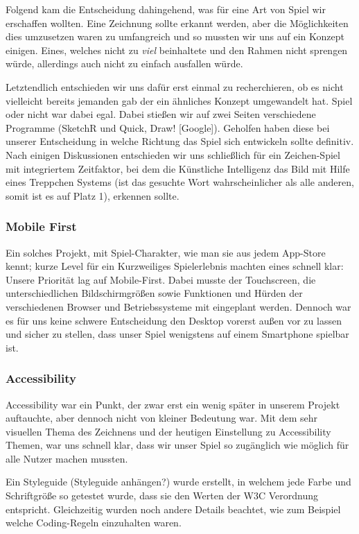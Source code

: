 \documentclass[11pt]{article}
\begin{document}
Folgend kam die Entscheidung dahingehend, was für eine Art von Spiel wir erschaffen wollten. Eine Zeichnung sollte erkannt werden, aber die Möglichkeiten dies umzusetzen waren zu umfangreich und so mussten wir uns auf ein Konzept einigen. Eines, welches nicht zu \textit{viel} beinhaltete und den Rahmen nicht sprengen würde, allerdings auch nicht zu einfach ausfallen würde.

Letztendlich entschieden wir uns dafür erst einmal zu recherchieren, ob es nicht vielleicht bereits jemanden gab der ein ähnliches Konzept umgewandelt hat. Spiel oder nicht war dabei egal.
Dabei stießen wir auf zwei Seiten verschiedene Programme (SketchR und Quick, Draw! [Google]). Geholfen haben diese bei unserer Entscheidung in welche Richtung das Spiel sich entwickeln sollte definitiv. Nach einigen Diskussionen entschieden wir uns schließlich für ein Zeichen-Spiel mit integriertem Zeitfaktor, bei dem die Künstliche Intelligenz das Bild mit Hilfe eines Treppchen Systems (ist das gesuchte Wort wahrscheinlicher als alle anderen, somit ist es auf Platz 1), erkennen sollte.

\subsubsection{Mobile First}

Ein solches Projekt, mit Spiel-Charakter, wie man sie aus jedem App-Store kennt; kurze Level für ein Kurzweiliges Spielerlebnis machten eines schnell klar: Unsere Priorität lag auf Mobile-First.
Dabei musste der Touchscreen, die unterschiedlichen Bildschirmgrößen sowie Funktionen und Hürden der verschiedenen Browser und Betriebssysteme mit eingeplant werden. Dennoch war es für uns keine schwere Entscheidung den Desktop vorerst außen vor zu lassen und sicher zu stellen, dass unser Spiel wenigstens auf einem Smartphone spielbar ist.

\subsubsection{Accessibility}

Accessibility war ein Punkt, der zwar erst ein wenig später in unserem Projekt auftauchte, aber dennoch nicht von kleiner Bedeutung war. Mit dem sehr visuellen Thema des Zeichnens und der heutigen Einstellung zu Accessibility Themen, war uns schnell klar, dass wir unser Spiel so zugänglich wie möglich für alle Nutzer machen mussten.

Ein Styleguide (Styleguide anhängen?) wurde erstellt, in welchem jede Farbe und Schriftgröße so getestet wurde, dass sie den Werten der W3C Verordnung entspricht.
Gleichzeitig wurden noch andere Details beachtet, wie zum Beispiel welche Coding-Regeln einzuhalten waren.
\end{document}
